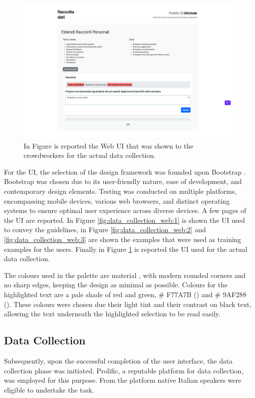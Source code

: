 \begin{figure}[!htbp]
    \centering
    \includegraphics[width=1\linewidth]{assets//imgs/UI-datacollection.png}
    \caption{In Figure is reported the Web UI that was shown to the crowdworkers for the actual data collection.}
    \label{fig:data_collection_web:4}
\end{figure}

For the UI, the selection of the design framework was founded upon Bootstrap \cite{bootstrap}. Bootstrap was chosen due to its user-friendly nature, ease of development, and contemporary design elements. Testing was conducted on multiple platforms, encompassing mobile devices, various web browsers, and distinct operating systems to ensure optimal user experience across diverse devices.
A few pages of the UI are reported. In Figure \ref{fig:data_collection_web:1} is shown the UI used to convey the guidelines, in Figure \ref{fig:data_collection_web:2} and \ref{fig:data_collection_web:3} are shown the examples that were used as training examples for the users. Finally in Figure \ref{fig:data_collection_web:4} is reported the UI used for the actual data collection.

The colours used in the palette are material \cite{material}, with modern rounded corners and no sharp edges, keeping the design as minimal as possible. Colours for the highlighted text are a pale shade of red and green, \# F77A7B (\redbg{\hspace{1em}}) and \# 9AF288 (\greenbg{\hspace{1em}}). These colours were chosen due their light tint and their contrast on black text, allowing the text underneath the highlighted selection to be read easily.


\subsection{Data Collection}
\label{cha:methodology-data-collection}
Subsequently, upon the successful completion of the user interface, the data collection phase was initiated. Prolific, a reputable platform \cite{prolific} for data collection, was employed for this purpose. From the platform native Italian speakers were eligible to undertake the task.

